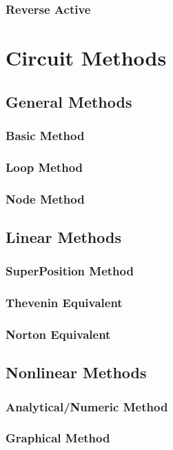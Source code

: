 \documentclass[a4paper]{report}
\begin{document}
\subsection{Reverse Active}









\chapter{Circuit Methods}
\section{General Methods}
\subsection{Basic Method}
\subsection{Loop Method}
\subsection{Node Method}


\section{Linear Methods}
\subsection{SuperPosition Method}
\subsection{Thevenin Equivalent}
\subsection{Norton Equivalent}

\section{Nonlinear Methods}
\subsection{Analytical/Numeric Method}
\subsection{Graphical Method}
\end{document}
